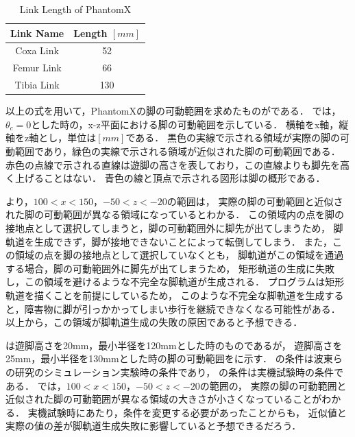 \begin{table}[h]
	\caption{Link Length of PhantomX}
	\label{tab:link_len_phantom_x}  %
	\begin{center}
   	\begin{tabular}{|c||c|} \hline  %
      Link Name & Length $[mm]$ \\ \hline  %
      Coxa Link & 52  \\ \hline  %
      Femur Link & 66  \\ \hline  %
      Tibia Link & 130  \\ \hline  %
    \end{tabular}
  \end{center}
\end{table}

\newpage

以上の式を用いて，PhantomXの脚の可動範囲を求めたものがである．
では，$\theta_c = 0$とした時の，x-z平面における脚の可動範囲を示している．
横軸をx軸，縦軸をz軸とし，単位は$[mm]$である．
黒色の実線で示される領域が実際の脚の可動範囲であり，緑色の実線で示される領域が近似された脚の可動範囲である．
赤色の点線で示される直線は遊脚の高さを表しており，この直線よりも脚先を高く上げることはない．
青色の線と頂点で示される図形は脚の概形である．

より，$100 < x < 150$，$-50 < z < -20$の範囲は，
実際の脚の可動範囲と近似された脚の可動範囲が異なる領域になっているとわかる．
この領域内の点を脚の接地点として選択してしまうと，脚の可動範囲外に脚先が出てしまうため，
脚軌道を生成できず，脚が接地できないことによって転倒してしまう．
また，この領域の点を脚の接地点として選択していなくとも，
脚軌道がこの領域を通過する場合，脚の可動範囲外に脚先が出てしまうため，
矩形軌道の生成に失敗し，この領域を避けるような不完全な脚軌道が生成される．
プログラムは矩形軌道を描くことを前提にしているため，
このような不完全な脚軌道を生成すると，障害物に脚が引っかかってしまい歩行を継続できなくなる可能性がある．
以上から，この領域が脚軌道生成の失敗の原因であると予想できる．

は遊脚高さを20mm，最小半径を120mmとした時のものであるが，
遊脚高さを25mm，最小半径を130mmとした時の脚の可動範囲をに示す．
の条件は波東らの研究\cite{Hato_Graph_search}のシミュレーション実験時の条件であり，
の条件は実機試験時の条件である．
では，$100 < x < 150$，$-50 < z < -20$の範囲の，
実際の脚の可動範囲と近似された脚の可動範囲が異なる領域の大きさが小さくなっていることがわかる．
実機試験時にあたり，条件を変更する必要があったことからも，
近似値と実際の値の差が脚軌道生成失敗に影響していると予想できるだろう．


